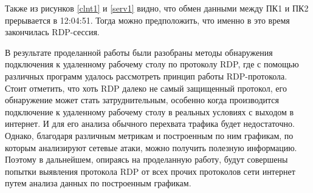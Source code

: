 \documentclass[bachelor, och, coursework]{SCWorks}
\begin{document}
  Также из рисунков \ref{clnt1} и \ref{serv1} видно, что обмен данными между ПК1 и ПК2 прерывается в 12:04:51. Тогда можно
  предположить, что именно в это время закончилась RDP-сессия.
  
  
  \conclusion
  
  В результате проделанной работы были разобраны методы обнаружения подключения к удаленному рабочему столу по протоколу RDP, где с помощью различных программ
  удалось рассмотреть принцип работы RDP-протокола. Стоит отметить, что хоть RDP далеко не самый защищенный протокол, его обнаружение может стать затруднительным,
  особенно когда производится подключение к удаленному рабочему столу в реальных условиях с выходом в интернет. И для его анализа обычного перехвата трафика будет
  недостаточно. Однако, благодаря различным метрикам и построенным по ним графикам, по которым анализируют сетевые атаки, можно получить полезную информацию. 
  Поэтому в дальнейшем, опираясь на проделанную работу, будут совершены попытки выявления протокола RDP от всех прочих протоколов сети интернет 
  путем анализа данных по построенным графикам.
  
\end{document}
